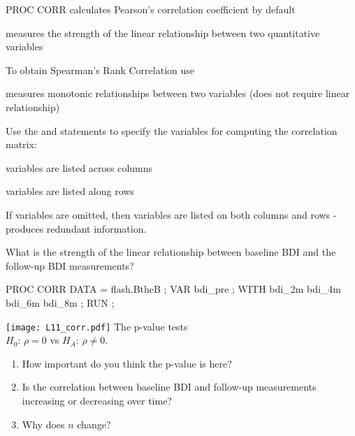 \begin{frame}
\bi
\item PROC CORR calculates Pearson's correlation coefficient by default
\bi
\item measures the strength of the linear relationship between two quantitative variables
\ei
\item To obtain Spearman's Rank Correlation use 
\bi
\item measures monotonic relationships between two variables (does not require linear relationship)
\ei
\item Use the  and  statements to specify the variables for computing the correlation matrix:
	\bi
	\item {} variables are listed across columns
	\item {} variables are listed along rows
    \item If  variables are omitted, then  variables are listed on both columns and rows - produces redundant information.
\ei
\ei
\end{frame}


\begin{frame}[fragile]
What is the strength of the linear relationship between baseline BDI and the follow-up BDI measurements?
\vskip10pt
\footnotesize
\begin{code}{.0}
PROC CORR DATA = flash.BtheB ;
   VAR bdi_pre ;
   WITH bdi_2m bdi_4m bdi_6m bdi_8m ;
RUN ;
\end{code}
\emp
\end{frame}

\begin{frame}[fragile]
\texttt{[image: L11\_corr.pdf]}
\emp
{} \hspace{0.05in} \emp
{}
The p-value tests\\ $H_0$: $\rho=0$ vs $H_A$: $\rho\neq0$.\\
\vskip5pt
\oyo
\begin{enumerate}
\item How important do you think the p-value is here?
\item Is the correlation between baseline BDI and follow-up measurements increasing or decreasing over time?
\item Why does $n$ change?
\end{enumerate}
\emp
\end{frame}

